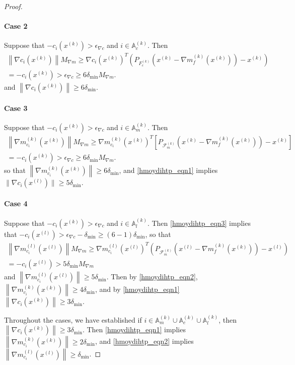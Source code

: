 \documentclass{article}
\theoremstyle{case}
\numberwithin{theorem}{subsection}
\newcommand{\feasiblek}{{\mathcal F_m^{(k)}}}
\newcommand{\gk}{{\nabla m_f^{(k)}\left(\xk\right)}}
\newcommand{\gmcik}{{\nabla m_{c_i}^{(k)}\left(\xk\right)}}
\newcommand{\gmcil}{{\nabla m_{c_i}^{(l)}\left(\xl\right)}}
\newcommand{\mingradepsilon}{{\epsilon_{\nabla c}}}
\newcommand{\xk}{x^{(k)}}
\newcommand{\xl}{{x^{(l)}}}
\newcommand{\truefeasiblek}{{F_c^{(k)}}}
\newcommand{\maxmodelgrad}{{M_{\nabla m}}}
\newcommand{\deltalb}{{\delta_{\textrm{min}}}}
\newcommand{\Amk}{{\mathbb A_m^{(k)}}}
\newcommand{\Alk}{{\mathbb A_l^{(k)}}}
\newcommand{\Ack}{{\mathbb A_c^{(k)}}}
\begin{document}
\begin{proof}
\paragraph{Case 2}
Suppose that $-c_i\left(\xk\right) > \mingradepsilon$ and $i \in \Ack$.
Then
\begin{align*}
\left\|\nabla c_i\left(\xk\right)  \right\| \maxmodelgrad
\ge \nabla c_i\left(\xk\right) ^T\left(P_{\truefeasiblek}\left(\xk - \gk\right) - \xk\right) \\
= -c_i\left(\xk\right) > \mingradepsilon \ge 6 \deltalb \maxmodelgrad.
\end{align*}
and $\left\|\nabla c_i\left(\xk\right)  \right\| \ge 6 \deltalb$.


\paragraph{Case 3}
Suppose that $-c_i\left(\xk\right) > \mingradepsilon$ and $i \in \Amk$.
Then
\begin{align*}
\left\|\gmcik\right\| \maxmodelgrad
\ge \gmcik^T\left[P_{\feasiblek}\left(\xk - \gk\right) - \xk\right] \\
= -c_i\left(\xk\right) > \mingradepsilon \ge 6 \deltalb \maxmodelgrad.
\end{align*}
so that $\left\|\gmcik\right\| \ge 6 \deltalb$, and \cref{hmoydihtp_eqn1} implies $\| \nabla c_i\left(\xl\right) \| \ge 5 \deltalb$.

\paragraph{Case 4}
Suppose that $-c_i\left(\xk\right) > \mingradepsilon$ and $i \in \Alk$.
Then \cref{hmoydihtp_eqn3} implies that $-c_i\left(\xl\right) > \mingradepsilon - \deltalb \ge (6 - 1) \deltalb $, so that
\begin{align*}
\left\|\gmcil\right\| \maxmodelgrad
\ge \gmcil^T\left(P_{\feasiblek}\left(\xl - \gk\right) - \xl\right) \\
= -c_i\left(\xl\right) > 5 \deltalb \maxmodelgrad
\end{align*}
and $\left\|\gmcil\right\| \ge 5 \deltalb$.
Then by \cref{hmoydihtp_eqn2}, $\left\|\gmcik\right\| \ge 4 \deltalb$, and by \cref{hmoydihtp_eqn1} $\left\|\nabla c_i\left(\xk\right) \right\| \ge 3 \deltalb$.





Throughout the cases, we have established if $i \in \Amk \cup \Ack \cup \Alk$, then $\left\| \nabla c_i\left(\xk\right) \right\| \ge 3 \deltalb$.
Then \cref{hmoydihtp_eqn1} implies $\left\|\gmcik\right\| \ge 2 \deltalb$, 
and \cref{hmoydihtp_eqn2} implies $\left\|\gmcil\right\| \ge \deltalb$.
\end{proof}
\end{document}
